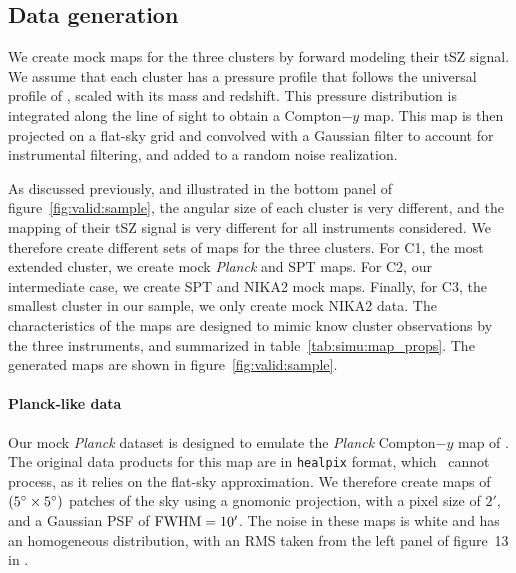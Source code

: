 \subsection{Data generation}

We create mock maps for the three clusters by forward modeling their tSZ signal.
We assume that each cluster has a pressure profile that follows the universal profile of \aten, scaled with its mass and redshift.
This pressure distribution is integrated along the line of sight to obtain a Compton$-y$ map.
This map is then projected on a flat-sky grid and convolved with a Gaussian filter to account for instrumental filtering, and added to a random noise realization.

As discussed previously, and illustrated in the bottom panel of figure~\ref{fig:valid:sample}, the angular size of each cluster is very different, and the mapping of their tSZ signal is very different for all instruments considered.
We therefore create different sets of maps for the three clusters.
For C1, the most extended cluster, we create mock \textit{Planck} and SPT maps.
For C2, our intermediate case, we create SPT and NIKA2 mock maps.
Finally, for C3, the smallest cluster in our sample, we only create mock NIKA2 data.
The characteristics of the maps are designed to mimic know cluster observations by the three instruments, and summarized in table~\ref{tab:simu:map_props}.
The generated maps are shown in figure~\ref{fig:valid:sample}.

\paragraph{Planck-like data}  %
Our mock \textit{Planck} dataset is designed to emulate the \textit{Planck} Compton$-y$ map of \citet{planck_collaboration_planck_2016}.
The original data products for this map are in \texttt{healpix} format, which \panco\ cannot process, as it relies on the flat-sky approximation.
We therefore create maps of $(5\degree \times 5\degree)$ patches of the sky using a gnomonic projection, with a pixel size of $2'$, and a Gaussian PSF of ${\rm FWHM} = 10'$.
The noise in these maps is white and has an homogeneous distribution, with an RMS taken from the left panel of figure~13 in \citet{planck_collaboration_planck_2016}.

